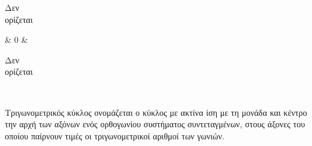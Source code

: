 \begin{center}
\begin{tabular}
\begin{minipage}{.8cm}
\begin{center}
{\scriptsize Δεν\\\vspace{-1mm}ορίζεται}
\end{center}
\end{minipage} & $ 0 $ & \begin{minipage}{.8cm}
\begin{center}
{\scriptsize Δεν\\\vspace{-1mm}ορίζεται}
\end{center}
\end{minipage} \\ 
\hline 
\end{tabular}
\end{center}
Τριγωνομετρικός κύκλος ονομάζεται ο κύκλος με ακτίνα ίση με τη μονάδα και κέντρο την αρχή των αξόνων ενός ορθογωνίου συστήματος συντεταγμένων, στους άξονες του οποίου παίρνουν τιμές οι τριγωνομετρικοί αριθμοί των γωνιών.
